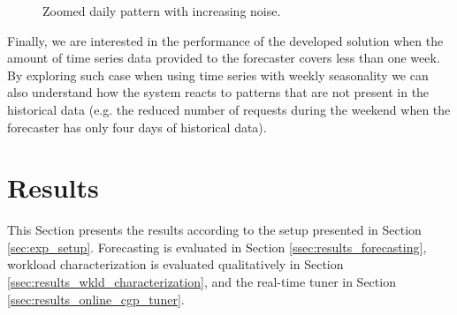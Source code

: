\documentclass[a4paper, 12pt]{article} %
\begin{document}
	\begin{figure}\centering
		 \hfill
		
		\caption{Zoomed daily pattern with increasing noise.}
		\label{fig:daily_noises}
	\end{figure}
	
	Finally, we are interested in the performance of the developed solution when the amount of time series data provided to the forecaster covers less than one week. By exploring such case when using time series with weekly seasonality we can also understand how the system reacts to patterns that are not present in the historical data (e.g. the reduced number of requests during the weekend when the forecaster has only four days of historical data).
	
	
	\section{Results } \label{sec:results}
	This Section presents the results according to the setup presented in Section \ref{sec:exp_setup}. Forecasting is evaluated in Section \ref{ssec:results_forecasting}, workload characterization is evaluated qualitatively in Section \ref{ssec:results_wkld_characterization}, and the real-time tuner in Section \ref{ssec:results_online_cgp_tuner}. 
	
\end{document}
